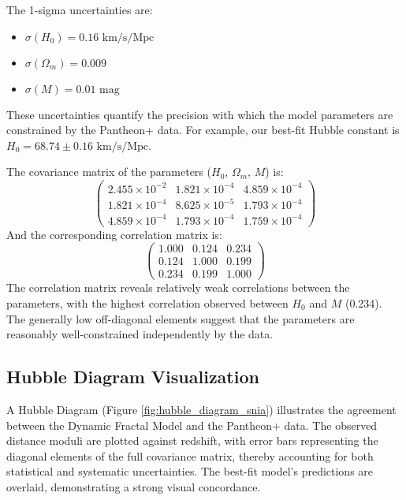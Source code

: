 \documentclass[aps,prl,twocolumn,groupedaddress]{revtex4-2}
\begin{document}
The 1-sigma uncertainties are:
\begin{itemize}
    \item $\sigma(H_0) = 0.16 \text{ km/s/Mpc}$
    \item $\sigma(\Omega_m) = 0.009$
    \item $\sigma(M) = 0.01 \text{ mag}$
\end{itemize}
These uncertainties quantify the precision with which the model parameters are constrained by the Pantheon+ data. For example, our best-fit Hubble constant is $H_0 = 68.74 \pm 0.16 \text{ km/s/Mpc}$.

The covariance matrix of the parameters ($H_0$, $\Omega_m$, $M$) is:
\begin{equation*}
\begin{pmatrix}
2.455 \times 10^{-2} & 1.821 \times 10^{-4} & 4.859 \times 10^{-4} \\
1.821 \times 10^{-4} & 8.625 \times 10^{-5} & 1.793 \times 10^{-4} \\
4.859 \times 10^{-4} & 1.793 \times 10^{-4} & 1.759 \times 10^{-4}
\end{pmatrix}
\end{equation*}
And the corresponding correlation matrix is:
\begin{equation*}
\begin{pmatrix}
1.000 & 0.124 & 0.234 \\
0.124 & 1.000 & 0.199 \\
0.234 & 0.199 & 1.000
\end{pmatrix}
\end{equation*}
The correlation matrix reveals relatively weak correlations between the parameters, with the highest correlation observed between $H_0$ and $M$ (0.234). The generally low off-diagonal elements suggest that the parameters are reasonably well-constrained independently by the data.

\subsection{Hubble Diagram Visualization}
A Hubble Diagram (Figure \ref{fig:hubble_diagram_snia}) illustrates the agreement between the Dynamic Fractal Model and the Pantheon+ data. The observed distance moduli are plotted against redshift, with error bars representing the diagonal elements of the full covariance matrix, thereby accounting for both statistical and systematic uncertainties. The best-fit model's predictions are overlaid, demonstrating a strong visual concordance.
\end{document}

